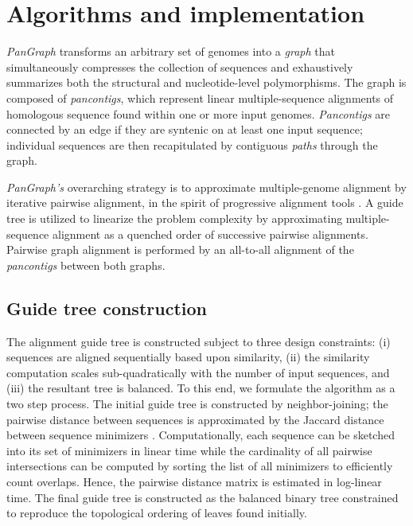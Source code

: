 \documentclass[aps,rmp,reprint,superscriptaddress,notitlepage,10pt]{revtex4-1}
\begin{document}
\section{Algorithms and implementation}
\emph{PanGraph} transforms an arbitrary set of genomes into a \emph{graph} that simultaneously compresses the collection of sequences and exhaustively summarizes both the structural and nucleotide-level polymorphisms.
The graph is composed of \emph{pancontigs}, which represent linear multiple-sequence alignments of homologous sequence found within one or more input genomes.
\emph{Pancontigs} are connected by an edge if they are syntenic on at least one input sequence; individual sequences are then recapitulated by contiguous \emph{paths} through the graph.

\emph{PanGraph's} overarching strategy is to approximate multiple-genome alignment by iterative pairwise alignment, in the spirit of progressive alignment tools \cite{darling2010progressivemauve,armstrong2020progressive}.
A guide tree is utilized to linearize the problem complexity by approximating multiple-sequence alignment as a quenched order of successive pairwise alignments.
Pairwise graph alignment is performed by an all-to-all alignment of the \emph{pancontigs} between both graphs.

\subsection{Guide tree construction}
The alignment guide tree is constructed subject to three design constraints: (i) sequences are aligned sequentially based upon similarity, (ii) the similarity computation scales sub-quadratically with the number of input sequences, and (iii) the resultant tree is balanced.
To this end, we formulate the algorithm as a two step process.
The initial guide tree is constructed by neighbor-joining; the pairwise distance between sequences is approximated by the Jaccard distance between sequence minimizers \cite{roberts2004reducing}.
Computationally, each sequence can be sketched into its set of minimizers in linear time while the cardinality of all pairwise intersections can be computed by sorting the list of all minimizers to efficiently count overlaps.
Hence, the pairwise distance matrix is estimated in log-linear time.
The final guide tree is constructed as the balanced binary tree constrained to reproduce the topological ordering of leaves found initially.
\end{document}

